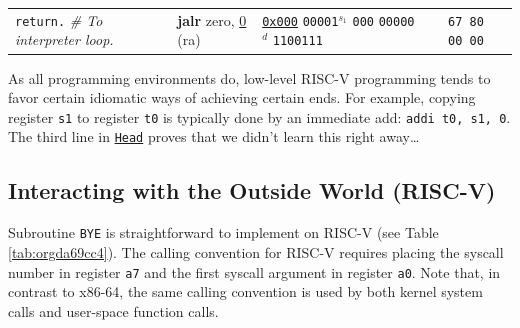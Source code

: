 \documentclass[a4paper,12pt,final]{article}
\begin{document}
\begin{table}[!htbp]
\begin{adjustwidth}{-1cm}{-1cm}
\begin{center}
\begin{tabular}{l|ll|l|l}
\hspace{1.053000em}​\texttt{return.}  \emph{\# To interpreter loop.} & \textbf{jalr} zero, \uline{0}​(ra) & \uline{\texttt{0x000}}                    \texttt{00001}​\(^{s_{1}}\) \texttt{000} \texttt{00000}​\(^{d}\)  \texttt{1100111} &  & \texttt{67 80 00 00}\\[0pt]
\end{tabular}

\end{center}
\normalsize \end{adjustwidth} \end{table} \vspace{0}

As all programming environments do, low-level RISC-V programming tends
to favor certain idiomatic ways of achieving certain ends.  For
example, copying register \texttt{s1} to register \texttt{t0} is typically done by
an immediate add: \texttt{addi t0, s1, 0}.  The third line in \hyperref[tab:org9639062]{\texttt{Head}} proves
that we didn't learn this right away\ldots{}
\clearpage


\subsection{Interacting with the Outside World (RISC-V)}
\label{sec:org202871c}

Subroutine \texttt{BYE} is straightforward to implement on RISC-V (see Table
\ref{tab:orgda69cc4}).  The calling convention for RISC-V requires placing
the syscall number in register \texttt{a7} and the first syscall argument in
register \texttt{a0}.  Note that, in contrast to x86-64, the same calling
convention is used by both kernel system calls and user-space function
calls.
\end{document}
